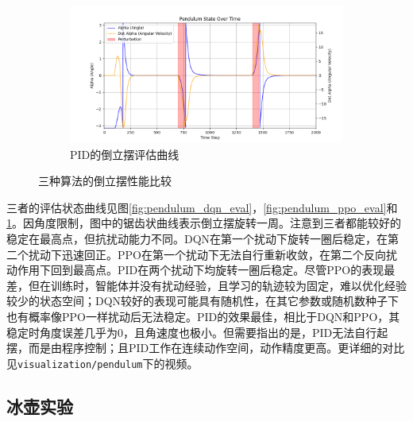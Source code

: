 \documentclass[12pt,a4paper]{article}
\begin{document}
\begin{figure}[htbp!]
    \begin{subfigure}[b]{0.49\textwidth}
        \centering
        \includegraphics[width=\textwidth]{images/pendulum_pid_eval.png}
        \caption{PID的倒立摆评估曲线}
        \label{fig:pendulum_pid_eval}
    \end{subfigure}
    \caption{三种算法的倒立摆性能比较}
    \label{fig:pendulum_all_eval}
\end{figure}

三者的评估状态曲线见图\ref{fig:pendulum_dqn_eval}，\ref{fig:pendulum_ppo_eval}和\ref{fig:pendulum_pid_eval}。因角度限制，图中的锯齿状曲线表示倒立摆旋转一周。注意到三者都能较好的稳定在最高点，但抗扰动能力不同。DQN在第一个扰动下旋转一圈后稳定，在第二个扰动下迅速回正。PPO在第一个扰动下无法自行重新收敛，在第二个反向扰动作用下回到最高点。PID在两个扰动下均旋转一圈后稳定。尽管PPO的表现最差，但在训练时，智能体并没有扰动经验，且学习的轨迹较为固定，难以优化经验较少的状态空间；DQN较好的表现可能具有随机性，在其它参数或随机数种子下也有概率像PPO一样扰动后无法稳定。PID的效果最佳，相比于DQN和PPO，其稳定时角度误差几乎为0，且角速度也极小。但需要指出的是，PID无法自行起摆，而是由程序控制；且PID工作在连续动作空间，动作精度更高。更详细的对比见\colorbox{gray!20}{\texttt{visualization/pendulum}}下的视频。



\subsection{冰壶实验}
\end{document}
